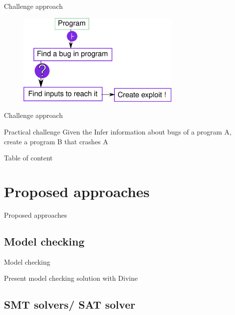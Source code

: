 \documentclass{beamer}
\begin{document}
\begin{frame}{Challenge approach}

\begin{figure}
\includegraphics[width=8cm]{Figures/Workflow.png}
\end{figure}

\end{frame}


\begin{frame}{Challenge approach}

\begin{block}{Practical challenge}
Given the Infer information about bugs of a program A, create a program B that crashes A
\end{block}

\end{frame}

\begin{frame}{Table of content}
\tableofcontents
\end{frame}

\section{Proposed approaches}

\begin{frame}
\centering

Proposed approaches
\end{frame}



\subsection{Model checking}

\begin{frame}{Model checking}

Present model checking solution with Divine

\end{frame}


\subsection{SMT solvers/ SAT solver}
\end{document}
